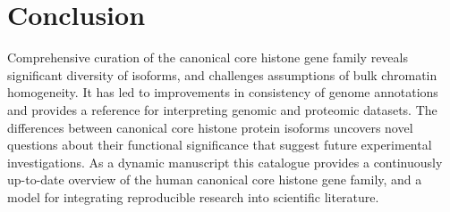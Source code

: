 \section{Conclusion}

  Comprehensive curation of the canonical core histone gene family
  reveals significant diversity of isoforms,
  and challenges assumptions of bulk chromatin homogeneity.
  It has led to improvements in consistency of genome annotations
  and provides a reference for interpreting genomic and proteomic datasets.
  The differences between canonical core histone protein isoforms
  uncovers novel questions about their functional significance
  that suggest future experimental investigations.
  As a dynamic manuscript this catalogue provides a continuously up-to-date overview
  of the human canonical core histone gene family,
  and a model for integrating reproducible research into scientific literature.
